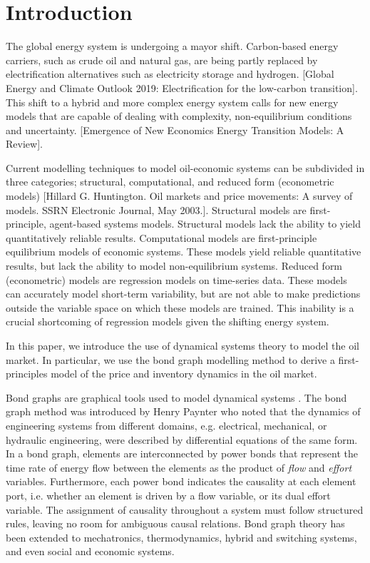 \section{Introduction}
\label{sec: intro}




The global energy system is undergoing a mayor shift. Carbon-based energy carriers, such as crude oil and natural gas, are being partly replaced by electrification alternatives such as electricity storage and hydrogen. [Global Energy and Climate Outlook 2019: Electrification for the low-carbon transition]. 
This shift to a hybrid and more complex energy system calls for new energy models that are capable of dealing with complexity, non-equilibrium conditions and uncertainty. [Emergence of New Economics Energy Transition Models: A Review].

 
Current modelling techniques to model oil-economic systems can be subdivided in three categories; structural, computational, and reduced form (econometric models) [Hillard G. Huntington. Oil markets and price movements: A survey of models. SSRN Electronic Journal, May 2003.]. Structural models are first-principle, agent-based systems models. Structural models lack the ability to yield quantitatively reliable results. 
Computational models are first-principle equilibrium models of economic systems.
These models yield reliable quantitative results, but lack the ability to model non-equilibrium systems. 
Reduced form (econometric) models are regression models on time-series data.
These models can accurately model short-term variability, but are not able to make predictions outside the variable space on which these models are trained.
This inability is a crucial shortcoming of regression models given the shifting energy system.

In this paper, we introduce the use of dynamical systems theory to model the oil market.
In particular, we use the bond graph modelling method to derive a first-principles model of the price and inventory dynamics in the oil market.



Bond graphs are graphical tools used to model dynamical systems \cite{}.
The bond graph method was introduced by Henry Paynter who noted that the dynamics of engineering systems from different domains, e.g. electrical, mechanical, or hydraulic engineering, were described by differential equations of the same form.
In a bond graph, elements are interconnected by power bonds that represent the time rate of energy flow between the elements as the product of \textit{flow} and \textit{effort} variables.
Furthermore, each power bond indicates the causality at each element port, i.e. whether an element is driven by a {flow} variable, or its dual {effort} variable. 
The assignment of causality throughout a system must follow structured rules, leaving no room for ambiguous causal relations.
Bond graph theory has been extended to mechatronics, thermodynamics, hybrid and switching systems, and even social and economic systems.

